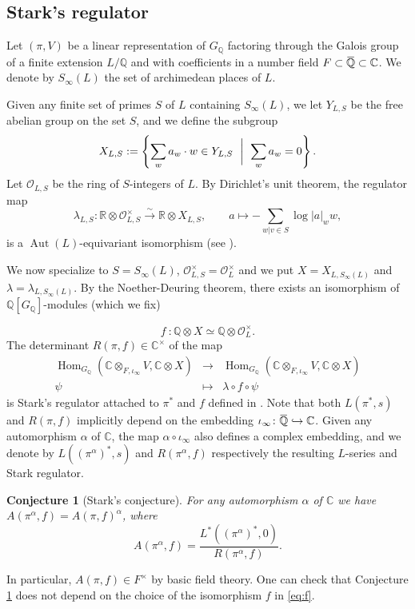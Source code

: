 \documentclass[12pt]{amsart}
\newcommand\bR{\mathbb{R}}
\newcommand\bC{\mathbb{C}}
\newcommand\bQ{\mathbb{Q}}
\newcommand\cO{\mathcal{O}}
\newcommand{\ob}[1]{\mkern 1.5mu\overline{\mkern-1.5mu#1\mkern-1.5mu}\mkern 1.5mu}
\DeclareMathOperator{\Hom}{Hom}
\DeclareMathOperator{\Aut}{Aut}
\theoremstyle{defstyle}
\theoremstyle{thmstyle}
\newtheorem{conjecture}[subsubsection]{Conjecture}
\begin{document}
\subsection{Stark's regulator}
Let $(\pi,V)$ be a linear representation of $G_{\bQ}$ factoring through the Galois group of a finite extension $L/\bQ$ and with coefficients in a number field $F \subset \ob{\bQ}\subset \bC$. We denote by $S_{\infty}(L)$ the set of archimedean places of $L$. 


Given any finite set of primes $S$ of $L$ containing $S_\infty(L)$, we let $Y_{L,S}$ be the free abelian group on the set $S$, and we define the subgroup
\begin{equation}\label{eq:definition_X_H,S}
	X_{L,S}:=\left\{\sum_{w} a_w\cdot w\in Y_{L,S}\ \biggm | \  \sum_{w}a_w=0\right\}.
\end{equation} 
Let $\cO_{L,S}$ be the ring of $S$-integers of ${L}$. By Dirichlet's unit theorem, the regulator map 
\begin{equation}\label{eq:dirichlet_reg}
	\lambda_{L,S} : \bR\otimes \cO_{L,S}^\times \overset{\sim}{\longrightarrow}\bR\otimes  X_{L,S}, \qquad a\mapsto - \sum_{w|v\in S}\log|a|_ww,
\end{equation}
is a $\Aut(L)$-equivariant isomorphism (see \cite[§1.1]{rubinstark}).

We now specialize to $S=S_\infty(L)$, $\cO_{L,S}^\times=\cO_{L}^\times$ and we put $X=X_{L,S_\infty(L)}$ and $\lambda=\lambda_{L,S_\infty(L)}$. 
By the Noether-Deuring theorem, there exists an isomorphism of $\bQ[G_{\bQ}]$-modules (which we fix)

\begin{equation}\label{eq:f} f\ \colon \bQ\otimes X \simeq \bQ\otimes \cO^\times_{L}. \end{equation}
The determinant $R(\pi,f)\in \bC^\times$ of the map
\[\begin{array}{rcl}
	\Hom_{G_{\bQ}}(\bC \otimes_{F,\iota_\infty} V, \bC\otimes X) & \longrightarrow &  \Hom_{G_{\bQ}}(\bC \otimes_{F,\iota_\infty} V, \bC\otimes X) \\
	\psi & \mapsto & \lambda \circ f \circ \psi
\end{array}\]
is Stark's regulator attached to $\pi^* $ and $f$ defined in \cite[Chap. I, \S4]{tate}. Note that both $L(\pi^*,s)$ and $R(\pi,f)$ implicitly depend on the embedding $\iota_\infty \colon \ob{\bQ}\hookrightarrow \bC$. Given any automorphism $\alpha$ of $\bC$, the map $\alpha \circ \iota_\infty$ also defines a complex embedding, and we denote by $L((\pi^\alpha)^*,s)$ and $R(\pi^\alpha,f)$ respectively the resulting $L$-series and Stark regulator.
\begin{conjecture}[Stark's conjecture]\label{conj:stark}
	For any automorphism $\alpha$ of $\bC$  we have $A(\pi^\alpha,f)=A(\pi,f)^\alpha$, where 
	\[
	A(\pi^\alpha,f)=\frac{L^*((\pi^\alpha)^*,0)}{R(\pi^\alpha,f)}. 
	\]
\end{conjecture}
In particular, $A(\pi,f)\in F^\times$ by basic field theory. One can check that Conjecture \ref{conj:stark} does not depend on the choice of the isomorphism $f$ in \eqref{eq:f}.
\end{document}
